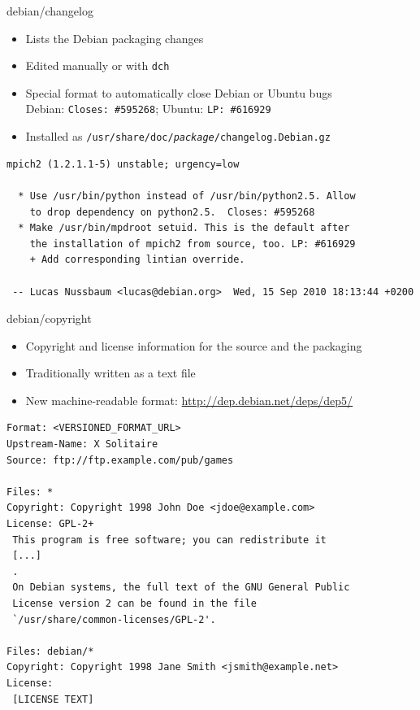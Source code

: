 \documentclass[10pt,final]{beamer}
\begin{document}
\begin{frame}[fragile]{debian/changelog}
  \begin{itemize}
  \item Lists the Debian packaging changes
  \item Edited manually or with \texttt{dch}
  \item Special format to automatically close Debian or Ubuntu bugs\\
    Debian: \texttt{Closes:~\#595268}; Ubuntu: \texttt{LP:~\#616929}
  \item Installed as \texttt{/usr/share/doc/\textit{package}/changelog.Debian.gz}
  \end{itemize}
  \begin{lstlisting}[basicstyle=\ttfamily\footnotesize]
mpich2 (1.2.1.1-5) unstable; urgency=low

  * Use /usr/bin/python instead of /usr/bin/python2.5. Allow
    to drop dependency on python2.5.  Closes: #595268
  * Make /usr/bin/mpdroot setuid. This is the default after
    the installation of mpich2 from source, too. LP: #616929
    + Add corresponding lintian override.

 -- Lucas Nussbaum <lucas@debian.org>  Wed, 15 Sep 2010 18:13:44 +0200
\end{lstlisting}
\end{frame}

\begin{frame}[fragile]{debian/copyright}
  \hbr
  \begin{itemize}
  \item Copyright and license information for the source and the packaging
  \item Traditionally written as a text file
  \item New machine-readable format: \url{http://dep.debian.net/deps/dep5/}
  \end{itemize}
  \begin{lstlisting}[basicstyle=\ttfamily\footnotesize]
Format: <VERSIONED_FORMAT_URL>
Upstream-Name: X Solitaire
Source: ftp://ftp.example.com/pub/games

Files: *
Copyright: Copyright 1998 John Doe <jdoe@example.com>
License: GPL-2+
 This program is free software; you can redistribute it
 [...]
 .
 On Debian systems, the full text of the GNU General Public
 License version 2 can be found in the file
 `/usr/share/common-licenses/GPL-2'.

Files: debian/*
Copyright: Copyright 1998 Jane Smith <jsmith@example.net>
License:
 [LICENSE TEXT]
\end{lstlisting}
\end{frame}
\end{document}
